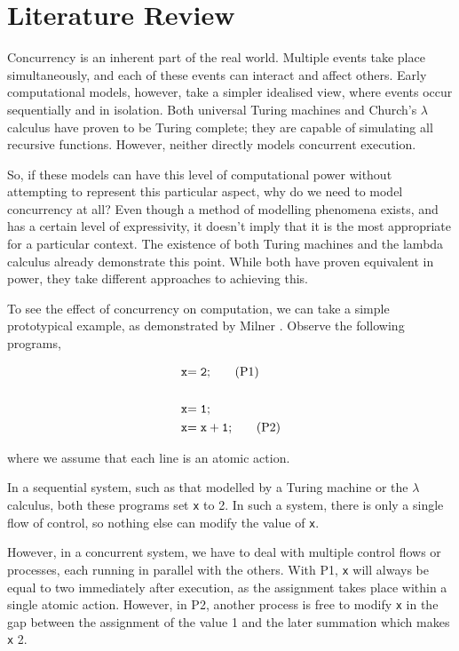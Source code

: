 \chapter{Literature Review}
Concurrency is an inherent part of the real world.  Multiple events take
place simultaneously, and each of these events can interact and affect
others.  Early computational models, however, take a simpler idealised
view, where events occur sequentially and in isolation.  Both universal
Turing machines \cite{turing:36} and Church's $\lambda$ calculus
\cite{church:41} have proven to be Turing complete; they are capable of
simulating all recursive functions.  However, neither directly models
concurrent execution.

So, if these models can have this level of computational power without
attempting to represent this particular aspect, why do we need to model
concurrency at all?  Even though a method of modelling phenomena exists,
and has a certain level of expressivity, it doesn't imply that it is the
most appropriate for a particular context.  The existence of both Turing
machines and the lambda calculus already demonstrate this point.  While
both have proven equivalent in power, they take different approaches to
achieving this.

To see the effect of concurrency on computation, we can take a simple
prototypical example, as demonstrated by Milner \cite{milner:lecture}.
Observe the following programs,

\begin{align*}
\mathtt{x} & \mathtt{= 2;}\tag{P1} \\
\\
\mathtt{x} & \mathtt{= 1;}\notag \\
\mathtt{x} & \mathtt{= x + 1;}\tag{P2}
\end{align*}

\noindent where we assume that each line is an atomic action.

In a sequential system, such as that modelled by a Turing machine or the
$\lambda$ calculus, both these programs set \texttt{x} to 2.  In such a
system, there is only a single flow of control, so nothing else can
modify the value of \texttt{x}.

However, in a concurrent system, we have to deal with multiple control
flows or processes, each running in parallel with the others.  With P1,
\texttt{x} will always be equal to two immediately after execution, as
the assignment takes place within a single atomic action.  However, in
P2, another process is free to modify \texttt{x} in the gap between the
assignment of the value 1 and the later summation which makes \texttt{x}
2.


